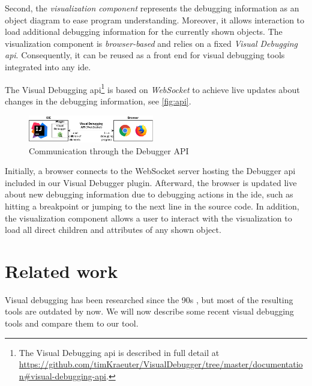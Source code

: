 \documentclass[conference]{IEEEtran}
\begin{document}
Second, the \textit{visualization component} represents the debugging information as an object diagram to ease program understanding.
Moreover, it allows interaction to load additional debugging information for the currently shown objects.
The visualization component is \emph{browser-based} and relies on a fixed \emph{Visual Debugging \gls*{api}}.
Consequently, it can be reused as a front end for visual debugging tools integrated into any \gls*{ide}.

The Visual Debugging \gls*{api}\footnote{The Visual Debugging \gls*{api} is described in full detail at \url{https://github.com/timKraeuter/VisualDebugger/tree/master/documentation\#visual-debugging-api}.} is based on \emph{WebSocket} to achieve live updates about changes in the debugging information, see \autoref{fig:api}.

\begin{figure}[h]
    \centering
    \includegraphics[width=0.488\textwidth]{images/VD-architecture.pdf}
    \caption{Communication through the Debugger API}
    \label{fig:api}
\end{figure}

Initially, a browser connects to the WebSocket server hosting the Debugger \gls*{api} included in our Visual Debugger plugin.
Afterward, the browser is updated live about new debugging information due to debugging actions in the \gls*{ide}, such as hitting a breakpoint or jumping to the next line in the source code.
In addition, the visualization component allows a user to interact with the visualization to load all direct children and attributes of any shown object.

\section{Related work} \label{sec:relatedWork}
Visual debugging has been researched since the 90s \cite{baeza-yatesVisualDebuggingAutomatic1996, jerdingUsingVisualizationFoster1994, mukherjeaVisualDebuggingIntegrating1994, hansonSimpleExtensibleGraphical1997}, but most of the resulting tools are outdated by now.
We will now describe some recent visual debugging tools and compare them to our tool.
\end{document}
